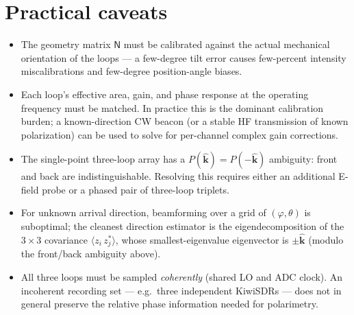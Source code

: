 \documentclass[11pt]{article}
\begin{document}
\section{Practical caveats}

\begin{itemize}\itemsep=2pt
\item The geometry matrix $\mathsf{N}$ must be calibrated against the
      actual mechanical orientation of the loops --- a few-degree tilt
      error causes few-percent intensity miscalibrations and
      few-degree position-angle biases.

\item Each loop's effective area, gain, and phase response at the
      operating frequency must be matched.  In practice this is the
      dominant calibration burden; a known-direction CW beacon (or a
      stable HF transmission of known polarization) can be used to
      solve for per-channel complex gain corrections.

\item The single-point three-loop array has a $P(\hat{\mathbf k})
      = P(-\hat{\mathbf k})$ ambiguity: front and back are
      indistinguishable.  Resolving this requires either an additional
      E-field probe or a phased pair of three-loop triplets.

\item For unknown arrival direction, beamforming over a grid of
      $(\varphi,\theta)$ is suboptimal; the cleanest direction
      estimator is the eigendecomposition of the $3\times 3$
      covariance $\langle z_i\,z_j^*\rangle$, whose smallest-eigenvalue
      eigenvector is $\pm\hat{\mathbf k}$ (modulo the front/back
      ambiguity above).

\item All three loops must be sampled \emph{coherently} (shared LO and
      ADC clock).  An incoherent recording set --- e.g.\ three
      independent KiwiSDRs --- does not in general preserve the relative
      phase information needed for polarimetry.
\end{itemize}
\end{document}
